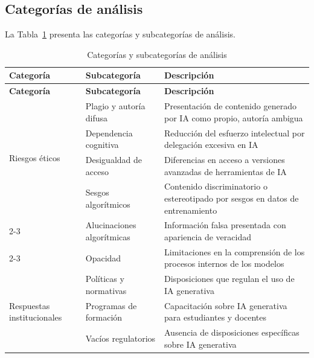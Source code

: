 \documentclass[review]{elsarticle}
\begin{document}
	\subsection{Categorías de análisis}
	
	La Tabla~\ref{tab:categorias} presenta las categorías y subcategorías de análisis.
	
	\begin{longtable}{p{3.2cm} p{3.6cm} p{5.6cm}}
		\caption{Categorías y subcategorías de análisis}\label{tab:categorias}\\
		\toprule
		\textbf{Categoría} & \textbf{Subcategoría} & \textbf{Descripción} \\
		\midrule
		\endfirsthead
		\toprule
		\textbf{Categoría} & \textbf{Subcategoría} & \textbf{Descripción} \\
		\midrule
		\endhead
		
		\multirow{4}{3.2cm}{Riesgos éticos} & Plagio y autoría difusa & Presentación de contenido generado por IA como propio, autoría ambigua \\
		\cmidrule{2-3}
		& Dependencia cognitiva & Reducción del esfuerzo intelectual por delegación excesiva en IA \\
		\cmidrule{2-3}
		& Desigualdad de acceso & Diferencias en acceso a versiones avanzadas de herramientas de IA \\
		\midrule
		
		\multirow{3}{3.2cm}{Riesgos técnicos} & Sesgos algorítmicos & Contenido discriminatorio o estereotipado por sesgos en datos de entrenamiento \\
		\cmidrule{2-3}
		& Alucinaciones algorítmicas & Información falsa presentada con apariencia de veracidad \\
		\cmidrule{2-3}
		& Opacidad & Limitaciones en la comprensión de los procesos internos de los modelos \\
		\midrule
		
		\multirow{3}{3.2cm}{Respuestas institucionales} & Políticas y normativas & Disposiciones que regulan el uso de IA generativa \\
		\cmidrule{2-3}
		& Programas de formación & Capacitación sobre IA generativa para estudiantes y docentes \\
		\cmidrule{2-3}
		& Vacíos regulatorios & Ausencia de disposiciones específicas sobre IA generativa \\
		
		\bottomrule
	\end{longtable}
	
\end{document}
